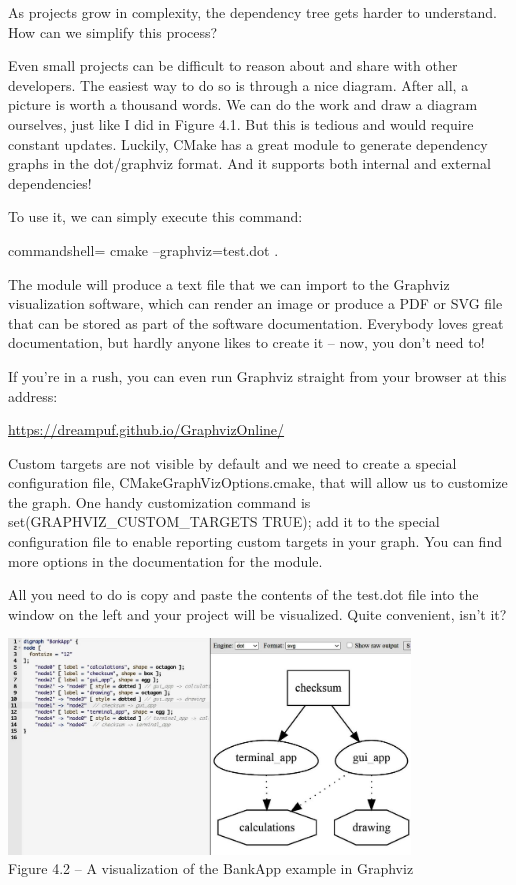 As projects grow in complexity, the dependency tree gets harder to understand. How can we simplify this process?


Even small projects can be difficult to reason about and share with other developers. The easiest way to do so is through a nice diagram. After all, a picture is worth a thousand words. We can do the work and draw a diagram ourselves, just like I did in Figure 4.1. But this is tedious and would require constant updates. Luckily, CMake has a great module to generate dependency graphs in the dot/graphviz format. And it supports both internal and external dependencies!

To use it, we can simply execute this command:

\begin{tcblisting}{commandshell={}}
cmake --graphviz=test.dot .
\end{tcblisting}

The module will produce a text file that we can import to the Graphviz visualization software, which can render an image or produce a PDF or SVG file that can be stored as part of the software documentation. Everybody loves great documentation, but hardly anyone likes to create it – now, you don't need to!

If you're in a rush, you can even run Graphviz straight from your browser at this address:

\url{https://dreampuf.github.io/GraphvizOnline/}

\begin{tcolorbox}[colback=blue!5!white,colframe=blue!75!black,title=Important Note]
Custom targets are not visible by default and we need to create a special configuration file, CMakeGraphVizOptions.cmake, that will allow us to customize the graph. One handy customization command is set(GRAPHVIZ\_CUSTOM\_TARGETS TRUE); add it to the special configuration file to enable reporting custom targets in your graph. You can find more options in the documentation for the module.
\end{tcolorbox}

All you need to do is copy and paste the contents of the test.dot file into the window on the left and your project will be visualized. Quite convenient, isn't it?

\begin{center}
\includegraphics[width=0.8\textwidth]{content/2/chapter4/images/2.jpg}\\
Figure 4.2 – A visualization of the BankApp example in Graphviz
\end{center}

